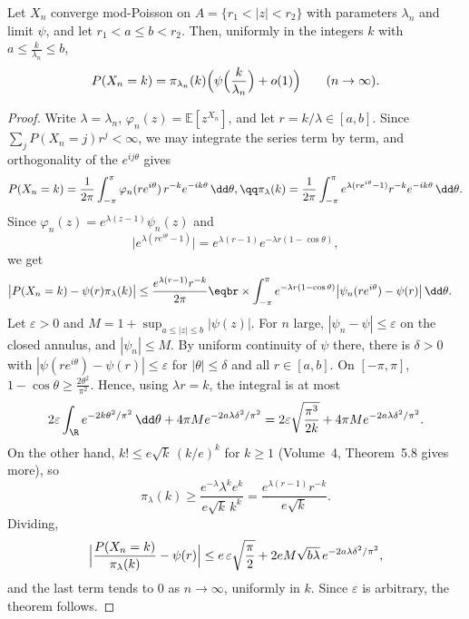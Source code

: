 \begin{theorem}\label{thm:modpoissonlocal}
Let $X_n$ converge mod-Poisson on $A=\{r_1<|z|<r_2\}$ with parameters $\lambda_n$ and limit $\psi$, and let $r_1<a\le b<r_2$. Then, uniformly in the integers $k$ with $a\le\frac k{\lambda_n}\le b$,
\[
P(X_n=k)=\pi_{\lambda_n}(k)\Bigl(\psi\Bigl(\frac k{\lambda_n}\Bigr)+o(1)\Bigr)\qquad(n\to\infty).
\]
\end{theorem}
\begin{proof}
Write $\lambda=\lambda_n$, $\varphi_n(z)=\mathbb E[z^{X_n}]$, and let $r=k/\lambda\in[a,b]$. Since $\sum_jP(X_n=j)r^j<\infty$, we may integrate the series term by term, and orthogonality of the $e^{ij\theta}$ gives
\[
\begin{gathered}P(X_n=k)=\frac1{2\pi}\int_{-\pi}^\pi\varphi_n(re^{i\theta})\,r^{-k}e^{-ik\theta}\,\dd\theta,\qq\pi_\lambda(k)=\frac1{2\pi}\int_{-\pi}^\pi e^{\lambda(re^{i\theta}-1)}r^{-k}e^{-ik\theta}\,\dd\theta .\end{gathered}
\]
Since $\varphi_n(z)=e^{\lambda(z-1)}\psi_n(z)$ and
\[
\bigl|e^{\lambda(re^{i\theta}-1)}\bigr|=e^{\lambda(r-1)}e^{-\lambda r(1-\cos\theta)},
\]
we get
\[
\begin{aligned}\bigl|P(X_n=k)-\psi(r)\pi_\lambda(k)\bigr|&\le\frac{e^{\lambda(r-1)}r^{-k}}{2\pi}\eqbr\times\int_{-\pi}^\pi e^{-\lambda r(1-\cos\theta)}\bigl|\psi_n(re^{i\theta})-\psi(r)\bigr|\,\dd\theta .\end{aligned}
\]
Let $\varepsilon>0$ and $M=1+\sup_{a\le|z|\le b}|\psi(z)|$. For $n$ large, $|\psi_n-\psi|\le\varepsilon$ on the closed annulus, and $|\psi_n|\le M$. By uniform continuity of $\psi$ there, there is $\delta>0$ with $|\psi(re^{i\theta})-\psi(r)|\le\varepsilon$ for $|\theta|\le\delta$ and all
$r\in[a,b]$. On $[-\pi,\pi]$, $1-\cos\theta\ge\frac{2\theta^2}{\pi^2}$. Hence, using $\lambda r=k$, the integral is at most
\[
2\varepsilon\int_\R e^{-2k\theta^2/\pi^2}\,\dd\theta+4\pi Me^{-2a\lambda\delta^2/\pi^2}=2\varepsilon\sqrt{\frac{\pi^3}{2k}}+4\pi Me^{-2a\lambda\delta^2/\pi^2}.
\]
On the other hand, $k!\le e\sqrt k\,(k/e)^k$ for $k\ge1$ (Volume~4, Theorem~5.8 gives more), so
\[
\pi_\lambda(k)\ge\frac{e^{-\lambda}\lambda^ke^k}{e\sqrt k\,k^k}=\frac{e^{\lambda(r-1)}r^{-k}}{e\sqrt k}.
\]
Dividing,
\[
\Bigl|\frac{P(X_n=k)}{\pi_\lambda(k)}-\psi(r)\Bigr|\le e\,\varepsilon\sqrt{\frac\pi2}+2eM\sqrt{b\lambda}\,e^{-2a\lambda\delta^2/\pi^2},
\]
and the last term tends to $0$ as $n\to\infty$, uniformly in $k$. Since $\varepsilon$ is arbitrary, the theorem follows.
\end{proof}

